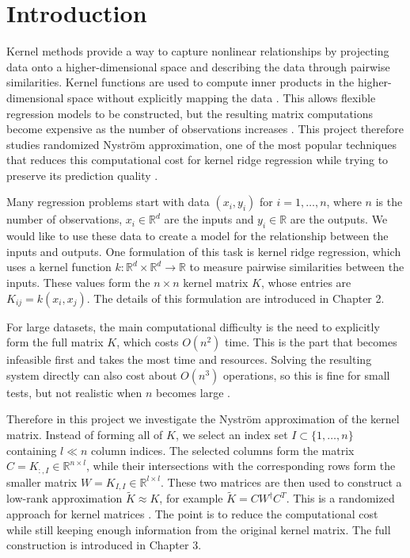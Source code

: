 \chapter{Introduction}
Kernel methods provide a way to capture nonlinear relationships by projecting data onto a higher-dimensional space and describing the data through pairwise similarities. Kernel functions are used to compute inner products in the higher-dimensional space without explicitly mapping the data \citep{hofmann2008kernel}. This allows flexible regression models to be constructed, but the resulting matrix computations become expensive as the number of observations increases \citep{bach2013sharp,alaoui2015fast}. This project therefore studies randomized Nystr\"om approximation, one of the most popular techniques that reduces this computational cost for kernel ridge regression while trying to preserve its prediction quality \citep{williams2000using,musco2017recursive}. 

Many regression problems start with data $(x_i,y_i)$ for $i=1,\ldots,n$, where $n$ is the number of observations, $x_i\in\mathbb{R}^d$ are the inputs and $y_i\in\mathbb{R}$ are the outputs. We would like to use these data to create a model for the relationship between the inputs and outputs. One formulation of this task is kernel ridge regression, which uses a kernel function $k:\mathbb{R}^d\times\mathbb{R}^d\to\mathbb{R}$ to measure pairwise similarities between the inputs. These values form the $n\times n$ kernel matrix $K$, whose entries are $K_{ij}=k(x_i,x_j)$. The details of this formulation are introduced in Chapter 2.

For large datasets, the main computational difficulty is the need to explicitly form the full matrix $K$, which costs $O(n^2)$ time. This is the part that becomes infeasible first and takes the most time and resources. Solving the resulting system directly can also cost about $O(n^3)$ operations, so this is fine for small tests, but not realistic when $n$ becomes large \citep{drineas2005nystrom,bach2013sharp,alaoui2015fast}.

Therefore in this project we investigate the Nystr\"om approximation of the kernel matrix. Instead of forming all of $K$, we select an index set $I\subset\{1,\ldots,n\}$ containing $l\ll n$ column indices. The selected columns form the matrix $C=K_{:,I}\in\mathbb{R}^{n\times l}$, while their intersections with the corresponding rows form the smaller matrix $W=K_{I,I}\in\mathbb{R}^{l\times l}$. These two matrices are then used to construct a low-rank approximation $\tilde K\approx K$, for example $\tilde K = CW^\dagger C^T$. This is a randomized approach for kernel matrices \citep{williams2000using,drineas2005nystrom,kumar2012sampling,gittens2013revisiting,gittens2016revisiting}. The point is to reduce the computational cost while still keeping enough information from the original kernel matrix. The full construction is introduced in Chapter 3.

